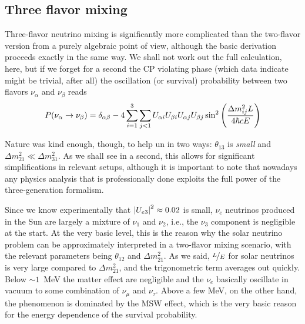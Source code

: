 \subsection{Three flavor mixing}


Three-flavor neutrino mixing is significantly more complicated than the two-flavor
version from a purely algebraic point of view, although the basic derivation proceeds
exactly in the same way. We shall not work out the full calculation, here, but if we
forget for a second the CP violating phase (which data indicate might be trivial,
after all) the oscillation (or survival) probability between two flavors $\nu_\alpha$
and $\nu_\beta$ reads
\begin{align}
  P(\nu_\alpha \rightarrow \nu_\beta) = \delta_{\alpha\beta} -
  4\sum_{i=1}^{3}\sum_{j < 1} U_{\alpha i} U_{\beta i}U_{\alpha j} U_{\beta j}
  \sin^2\qty(\frac{\Delta m^2_{ij} L}{4\hbar c E})
\end{align}

Nature was kind enough, though, to help un in two ways: $\theta_{13}$ is
\emph{small} and $\Delta m^2_{21} \ll \Delta m^2_{31}$. As we shall see in a second,
this allows for significant simplifications in relevant setups, although it is
important to note that nowadays any physics analysis that is professionally done
exploits the full power of the three-generation formalism.


Since we know experimentally that $\abs{U_{e3}}^2 \approx 0.02$ is small, $\nu_e$
neutrinos produced in the Sun are largely a mixture of $\nu_1$ and $\nu_2$, i.e., the
$\nu_3$ component is negligible at the start. At the very basic level, this is the
reason why the solar neutrino problem can be approximately interpreted in a two-flavor
mixing scenario, with the relevant parameters being $\theta_{12}$ and $\Delta m^2_{21}$.
As we said, $\nicefrac{L}{E}$ for solar neutrinos is very large compared to
$\Delta m^2_{21}$, and the trigonometric term averages out quickly. Below $\sim 1$~MeV
the matter effect are negligible and the $\nu_e$ basically  oscillate in vacuum
to some combination of $\nu_\mu$ and $\nu_\tau$.
Above a few MeV, on the other hand, the phenomenon is dominated by the MSW effect,
which is the very basic reason for the energy dependence of the survival probability.

